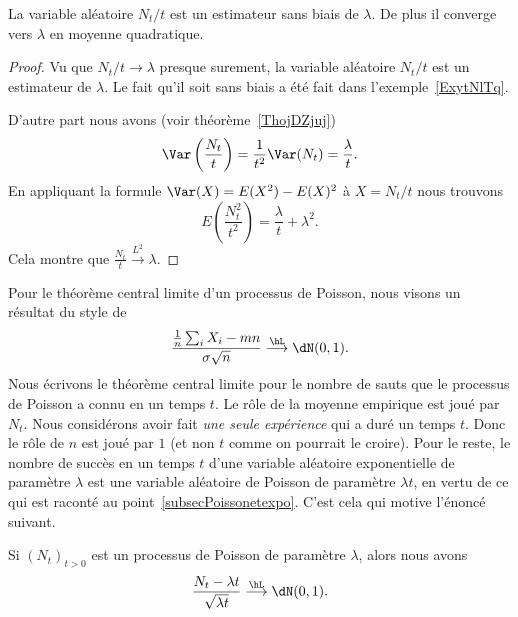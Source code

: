 \begin{proposition}
	La variable aléatoire \( N_t/t\) est un estimateur sans biais de \( \lambda\). De plus il converge vers \( \lambda\) en moyenne quadratique.
\end{proposition}

\begin{proof}
	Vu que \( N_t/t\to\lambda\) presque surement, la variable aléatoire \( N_t/t\) est un estimateur de \( \lambda\). Le fait qu'il soit sans biais a été fait dans l'exemple~\ref{ExytNlTq}.

	D'autre part nous avons (voir théorème~\ref{ThojDZjuj})
	\begin{equation}
		\Var\left( \frac{ N_t }{ t } \right)=\frac{1}{ t^2 }\Var(N_t)=\frac{ \lambda }{ t }.
	\end{equation}
	En appliquant la formule \( \Var(X)=E(X^2)-E(X)^2\) à \( X=N_t/t\) nous trouvons
	\begin{equation}
		E\left( \frac{ N_t^2 }{ t^2 } \right)=\frac{ \lambda }{ t }+\lambda^2.
	\end{equation}
	Cela montre que \( \frac{ N_t }{ t }\stackrel{L^2}{\longrightarrow}\lambda\).
\end{proof}

Pour le théorème central limite d'un processus de Poisson, nous visons un résultat du style de
\begin{equation}
	\frac{ \frac{1}{ n }\sum_iX_i-mn }{ \sigma\sqrt{n} }\stackrel{\hL}{\longrightarrow}\dN(0,1).
\end{equation}
Nous écrivons le théorème central limite pour le nombre de sauts que le processus de Poisson a connu en un temps \( t\). Le rôle de la moyenne empirique est joué par \( N_t\). Nous considérons avoir fait \emph{une seule expérience} qui a duré un temps \( t\). Donc le rôle de \( n\) est joué par \( 1\) (et non \( t\) comme on pourrait le croire). Pour le reste, le nombre de succès en un temps \( t\) d'une variable aléatoire exponentielle de paramètre \( \lambda\) est une variable aléatoire de Poisson de paramètre \( \lambda t\), en vertu de ce qui est raconté au point~\ref{subsecPoissonetexpo}. C'est cela qui motive l'énoncé suivant.

\begin{theorem}  \label{ThoCSuLLo}
	Si \( (N_t)_{t>0}\) est un processus de Poisson de paramètre \( \lambda\), alors nous avons
	\begin{equation}
		\frac{ N_t-\lambda t }{ \sqrt{\lambda t} }\stackrel{\hL}{\longrightarrow}\dN(0,1).
	\end{equation}
\end{theorem}

